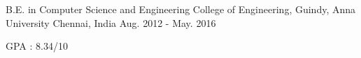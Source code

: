 

\begin{cventries}

  \cventry
    {B.E. in Computer Science and Engineering} %
    {College of Engineering, Guindy, Anna University} %
    {Chennai, India} %
    {Aug. 2012 - May. 2016} %
    {
      \begin{cvitems} %
        \item {GPA : 8.34/10}
      \end{cvitems}
    }

\end{cventries}
